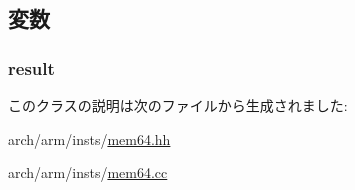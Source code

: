 \subsection{変数}
\hypertarget{classArmISA_1_1MemoryEx64_a43f8ecc8130e5285e0ae2134151d6d6a}{
\subsubsection[{result}]{ {\bf result}}}
\label{classArmISA_1_1MemoryEx64_a43f8ecc8130e5285e0ae2134151d6d6a}


このクラスの説明は次のファイルから生成されました:\begin{DoxyCompactItemize}
\item 
arch/arm/insts/\hyperlink{mem64_8hh}{mem64.hh}\item 
arch/arm/insts/\hyperlink{mem64_8cc}{mem64.cc}\end{DoxyCompactItemize}
